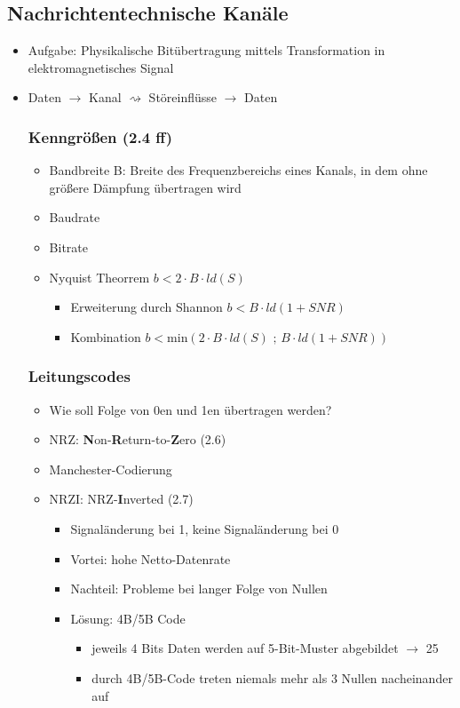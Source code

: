\subsection{Nachrichtentechnische Kanäle}
\begin{itemize}
	\item Aufgabe: Physikalische Bitübertragung mittels Transformation in elektromagnetisches Signal
	\item Daten \(\to\) Kanal \(\rightsquigarrow\) Störeinflüsse \(\to\) Daten

\subsubsection{Kenngrößen (2.4 ff)}
	\begin{itemize}
		\item Bandbreite B: Breite des Frequenzbereichs eines Kanals, in dem ohne größere Dämpfung übertragen wird
		\item Baudrate %
		\item Bitrate
		\item Nyquist Theorrem \( b < 2 \cdot B \cdot ld(S) \)
		\begin{itemize}
			\item Erweiterung durch Shannon \( b < B \cdot ld(1+SNR)\)
			\item Kombination \(b < \text{min}(2 \cdot B \cdot ld(S)\text{ ; } B \cdot ld(1+SNR) )\)
		\end{itemize}		
	\end{itemize}

\subsubsection{Leitungscodes}
	\begin{itemize}
		\item Wie soll Folge von 0en und 1en übertragen werden?
		\item NRZ: \textbf{N}on-\textbf{R}eturn-to-\textbf{Z}ero  (2.6)
		\item Manchester-Codierung
		\item NRZI: NRZ-\textbf{I}nverted (2.7)
		\begin{itemize}
			\item Signaländerung bei 1, keine Signaländerung bei 0
			\item Vortei: hohe Netto-Datenrate
			\item Nachteil: Probleme bei langer Folge von Nullen
			\item Lösung: 4B/5B Code
			\begin{itemize}
				\item jeweils 4 Bits Daten werden auf 5-Bit-Muster abgebildet \(\to\) 25%
				\item durch 4B/5B-Code treten niemals mehr als 3 Nullen nacheinander auf
			\end{itemize}
		\end{itemize}
	\end{itemize}
\end{itemize}

